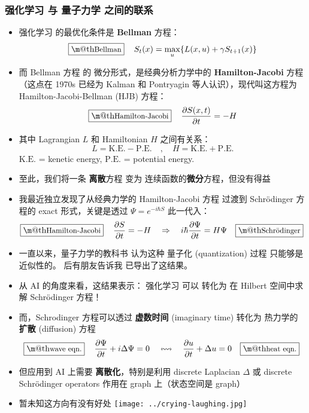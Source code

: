 \documentclass[15pt]{beamer}
\makeatletter
\newcommand{\red}[1]{{\color{red}#1}}
\renewcommand{\boxed}[1]{\fbox{\m@th$\displaystyle\scalebox{0.9}{#1}$} \,}
\makeatother
\begin{document}
\begin{frame}
\frametitle{强化学习 与 量子力学 之间的联系}
\begin{itemize}
	\item 强化学习 的最优化条件是 \textbf{Bellman} 方程：
		\begin{equation}
			\boxed{\mbox{Bellman}} \quad S_t(x) = \max_u \{ L(x,u) + \gamma S_{t+1}(x) \}
		\end{equation}
	\item 而 Bellman 方程 的 微分形式，是经典分析力学中的 \textbf{Hamilton-Jacobi} 方程 （这点在 1970s 已经为 Kalman 和 Pontryagin 等人认识），现代叫这方程为 Hamilton-Jacobi-Bellman (HJB) 方程：
		\begin{equation}
			\boxed{\mbox{Hamilton-Jacobi}} \quad \frac{\partial S(x, t)}{\partial t} = -H
		\end{equation}
	\item 其中 Lagrangian $L$ 和 Hamiltonian $H$ 之间有关系：
	\begin{equation}
		L = \text{K.E.} - \text{P.E.} \quad , \quad H = \text{K.E.} + \text{P.E.}
	\end{equation}
		$\text{K.E.}$ = kenetic energy, $\text{P.E.}$ = potential energy.
	\item 至此，我们将一条 \textbf{离散}方程 变为 连续函数的\textbf{微分}方程，但\red{没有得益}
\end{itemize}
\end{frame}

\begin{frame}[plain]
\begin{itemize}
	\item 我最近独立发现了从经典力学的 Hamilton-Jacobi 方程 过渡到 Schr\"{o}dinger 方程的 exact 形式，关键是透过 $\Psi = e^{-i \hbar S}$ 此一代入：
		\begin{equation}
		\boxed{\mbox{Hamilton-Jacobi}} \quad \frac{\partial S}{\partial t} = - H \quad
		\Rightarrow
		\quad i \hbar \frac{\partial \Psi}{\partial t} = H \Psi \quad \boxed{\mbox{Schr\"{o}dinger}}
		\end{equation} 
	\item 一直以来，量子力学的教科书 认为这种 量子化 (quantization) 过程 只能够是近似性的。  后有朋友告诉我 \parencite{Field2010} 已导出了这结果。
	\item 从 AI 的角度来看，这结果表示： \red{强化学习 可以 转化为 在 Hilbert 空间中求解 Schr\"{o}dinger 方程！}
	\item 而，Schrodinger 方程可以透过 \textbf{虚数时间} (imaginary time) 转化为 热力学的 \textbf{扩散} (diffusion) 方程
		\begin{equation}
			\boxed{\mbox{wave eqn.}} \quad \frac{\partial \Psi}{\partial t} + i \Delta \Psi = 0
			\quad \leftrightsquigarrow \quad
			\frac{\partial u}{\partial t} + \Delta u = 0 \quad \boxed{\mbox{heat eqn.}}
		\end{equation}
	\item 但应用到 AI 上需要 \textbf{离散化}，特别是利用 discrete Laplacian $\Delta$ 或 discrete Schr\"{o}dinger operators 作用在 \red{graph} 上（状态空间是 graph）
	\item 暂未知这方向有没有好处 \texttt{[image: ../crying-laughing.jpg]}
\end{itemize}
\end{frame}
\end{document}
